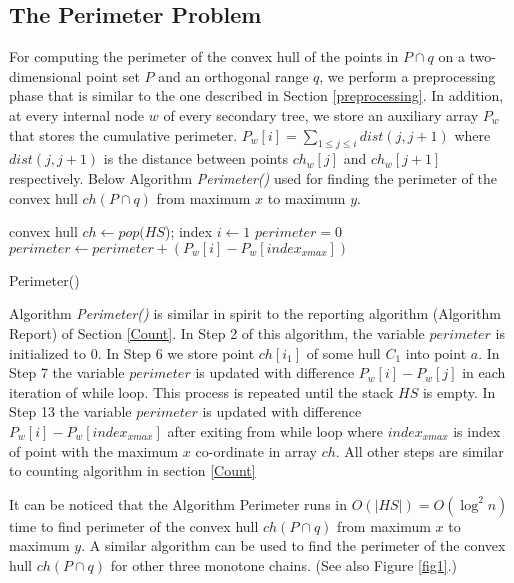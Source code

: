 \documentclass[runningheads,a4paper]{llncs}
\begin{document}
{\subsection{The Perimeter Problem}
For computing the perimeter of the convex hull of the points in $P\cap q$ on a
two-dimensional point set $P$ and an orthogonal range $q$, we perform a
preprocessing phase that is similar to the one described in Section
\ref{preprocessing}. In addition, at every internal node $w$ of every
secondary tree, we store an auxiliary array $P_{w}$ that stores the cumulative perimeter.
$P_{w}[i]=\displaystyle\sum\limits_{1\le j\le i} dist(j,j+1)$ where
$dist(j,j+1)$ is the distance between points $ch_{w}[j]$ and $ch_{w}[j+1]$
respectively.  Below Algorithm  {\em Perimeter()} used for finding the perimeter of the convex
hull $ch(P \cap q)$ from maximum $x$ to maximum $y$.
\vspace{-0.7cm}
\begin{algorithm}
  convex hull $ch \leftarrow pop(HS$);
  index $i \leftarrow 1$\;
   $perimeter=0$\;
  $perimeter \leftarrow perimeter+(P_{w}[i]-P_{w}[index_{xmax}])$\;
  \caption{Perimeter()}
\end{algorithm}
\vspace{-0.7cm}
Algorithm {\em Perimeter()} is similar in spirit to the reporting
algorithm (Algorithm Report) of Section \ref{Count}.
In Step 2 of this algorithm, the variable $perimeter$ is initialized to
$0$. In Step 6 we store point $ch[i_{1}]$ of some hull $C_{1}$ into point $a$.  In
Step 7 the variable $perimeter$ is updated with difference $P_{w}[i]-P_{w}[j]$
in each iteration of while loop. This process is repeated until the stack $HS$
is empty.
In Step 13 the variable $perimeter$ is updated with difference
$P_{w}[i]-P_{w}[index_{xmax}]$ after exiting from while loop where
$index_{xmax}$ is index of point with the maximum $x$ co-ordinate in array
$ch$. All other steps are similar to counting algorithm in section \ref{Count}

It can be noticed that the Algorithm Perimeter runs in $O(|HS|) =
O(\log^{2}n)$ time to find perimeter of the convex hull $ch(P \cap q)$ from
maximum $x$ to maximum $y$. A similar algorithm can be used to find the
perimeter of the convex hull $ch(P \cap q)$ for other three monotone
chains. (See also Figure \ref{fig1}.)

}
\end{document}
